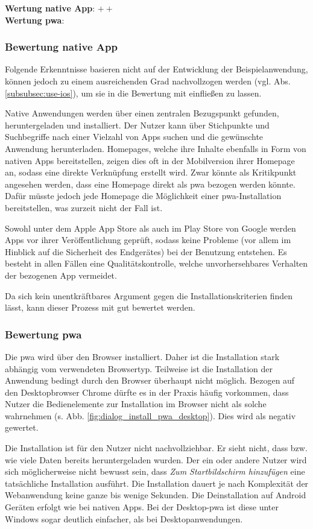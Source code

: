 \textbf{Wertung native App}: $++$ \\
\textbf{Wertung \ac{pwa}}: \Circle

\subsubsection{Bewertung native App}
Folgende Erkenntnisse basieren nicht auf der Entwicklung der Beispielanwendung, können jedoch zu einem ausreichenden Grad nachvollzogen werden (vgl. Abs. \ref{subsubsec:use-ios}), um sie in die Bewertung mit einfließen zu lassen.

 Native Anwendungen werden über einen zentralen Bezugspunkt gefunden, heruntergeladen und installiert. Der Nutzer kann über Stichpunkte und Suchbegriffe nach einer Vielzahl von Apps suchen und die gewünschte Anwendung herunterladen. Homepages, welche ihre Inhalte ebenfalls in Form von nativen Apps bereitstellen, zeigen dies oft in der Mobilversion ihrer Homepage an, sodass eine direkte Verknüpfung erstellt wird. Zwar könnte als Kritikpunkt angesehen werden, dass eine Homepage direkt als \ac{pwa} bezogen werden könnte. Dafür müsste jedoch jede Homepage die Möglichkeit einer \ac{pwa}-Installation bereitstellen, was zurzeit nicht der Fall ist.
 
 Sowohl unter dem Apple App Store als auch im Play Store von Google werden Apps vor ihrer Veröffentlichung geprüft, sodass keine Probleme (vor allem im Hinblick auf die Sicherheit des Endgerätes) bei der Benutzung entstehen. Es besteht in allen Fällen eine Qualitätskontrolle, welche unvorhersehbares Verhalten der bezogenen App vermeidet.
 
 Da sich kein unentkräftbares Argument gegen die Installationskriterien finden lässt, kann dieser Prozess mit gut bewertet werden.
 
\subsubsection{Bewertung \ac{pwa}}
Die \ac{pwa} wird über den Browser installiert. Daher ist die Installation stark abhängig vom verwendeten Browsertyp. Teilweise ist die Installation der Anwendung bedingt durch den Browser überhaupt nicht möglich. Bezogen auf den Desktopbrowser Chrome dürfte es in der Praxis häufig vorkommen, dass Nutzer die Bedienelemente zur Installation im Browser nicht als solche wahrnehmen (s. Abb. \ref{fig:dialog_install_pwa_desktop}). Dies wird als negativ gewertet.

Die Installation ist für den Nutzer nicht nachvollziehbar. Er sieht nicht, dass bzw. wie viele Daten bereits heruntergeladen wurden. Der ein oder andere Nutzer wird sich möglicherweise nicht bewusst sein, dass \textit{Zum Startbildschirm hinzufügen} eine tatsächliche Installation ausführt. Die Installation dauert je nach Komplexität der Webanwendung keine ganze bis wenige Sekunden. Die Deinstallation auf Android Geräten erfolgt wie bei nativen Apps. Bei der Desktop-\ac{pwa} ist diese unter Windows sogar deutlich einfacher, als bei Desktopanwendungen.

